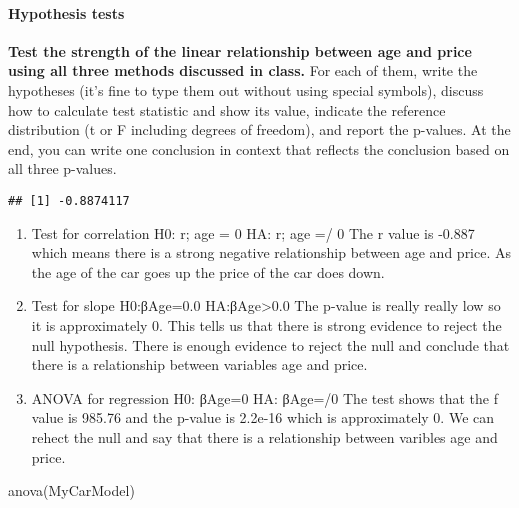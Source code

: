 \documentclass[
]{article}
\newenvironment{Shaded}{\begin{snugshade}}{\end{snugshade}}
\newcommand{\FunctionTok}[1]{\textcolor[rgb]{0.00,0.00,0.00}{#1}}
\newcommand{\NormalTok}[1]{#1}
\newcommand{\SpecialCharTok}[1]{\textcolor[rgb]{0.00,0.00,0.00}{#1}}
\begin{document}
\hypertarget{hypothesis-tests}{%
\paragraph{Hypothesis tests}\label{hypothesis-tests}}

\textbf{Test the strength of the linear relationship between age and
price using all three methods discussed in class.} For each of them,
write the hypotheses (it's fine to type them out without using special
symbols), discuss how to calculate test statistic and show its value,
indicate the reference distribution (t or F including degrees of
freedom), and report the p-values. At the end, you can write one
conclusion in context that reflects the conclusion based on all three
p-values.

\begin{Shaded}
\end{Shaded}

\begin{verbatim}
## [1] -0.8874117
\end{verbatim}

\begin{enumerate}
\def\labelenumi{\arabic{enumi}.}
\item
  Test for correlation H0: r; age = 0 HA: r; age =/ 0 The r value is
  -0.887 which means there is a strong negative relationship between age
  and price. As the age of the car goes up the price of the car does
  down.
\item
  Test for slope H0:βAge=0.0 HA:βAge\textgreater0.0 The p-value is
  really really low so it is approximately 0. This tells us that there
  is strong evidence to reject the null hypothesis. There is enough
  evidence to reject the null and conclude that there is a relationship
  between variables age and price.
\item
  ANOVA for regression H0: βAge=0 HA: βAge=/0 The test shows that the f
  value is 985.76 and the p-value is 2.2e-16 which is approximately 0.
  We can rehect the null and say that there is a relationship between
  varibles age and price.
\end{enumerate}

\begin{Shaded}
\begin{Highlighting}[]
\FunctionTok{anova}\NormalTok{(MyCarModel)}
\end{Highlighting}
\end{Shaded}
\end{document}
